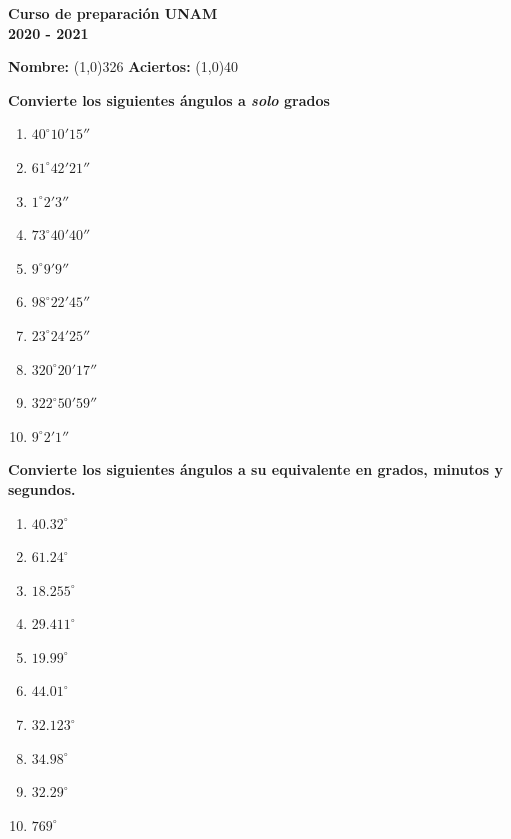 \documentclass[12pt]{article}
\begin{document}
\begin{center}
  \textbf{ \Large{Curso de preparación UNAM} \\[2mm] 
  \large{2020 - 2021}}	
\end{center}

\begin{flushleft}	
  \textbf{Nombre: }
  \line(1,0){326}\;\;
  \textbf{Aciertos: }
  \line(1,0){40}\\  
\end{flushleft}	
\noindent
\textbf{Convierte los siguientes ángulos a \textit{solo} grados}
 \begin{multicols}{2}
		\begin{enumerate}
		\setlength\itemsep{3.6cm}
		\item $40^\circ 10' 15''$
		\item $61^\circ 42' 21''$
		\item $1^\circ 2' 3''$
		\item $73^\circ 40' 40''$
		\item $9^\circ 9' 9''$
		\item $98^\circ 22' 45''$
		\item $23^\circ 24' 25''$
		\item $320^\circ 20' 17''$
		\item $322^\circ 50' 59''$
		\item $9^\circ 2' 1''$
	\end{enumerate}
 \end{multicols}

\newpage
\noindent
\textbf{Convierte los siguientes ángulos a su equivalente en grados, minutos y segundos.}
 \begin{multicols}{2}
		\begin{enumerate}
		\setlength\itemsep{3.6cm}
		\item $40.32^\circ$
		\item $61.24^\circ$
		\item $18.255^\circ$
		\item $29.411^\circ$
		\item $19.99^\circ$
		\item $44.01^\circ$
		\item $32.123^\circ$
		\item $34.98^\circ$
		\item $32.29^\circ$
		\item $769^\circ$
	\end{enumerate}
 \end{multicols}
\end{document}
